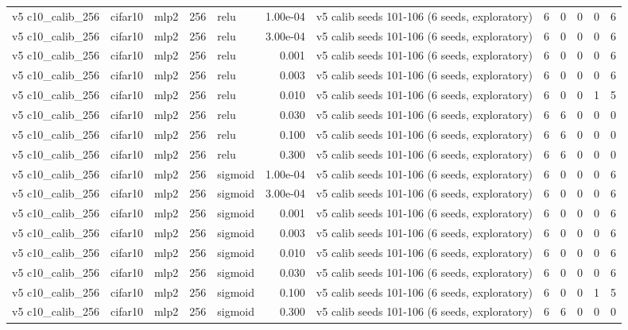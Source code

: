 \begin{table}[htbp]
{\begin{tabular}{@{}lllrlrlrrrrr@{}}
v5 c10\_calib\_256 & cifar10 & mlp2 & 256 & relu & 1.00e-04 & v5 calib seeds 101-106 (6 seeds, exploratory) & 6 & 0 & 0 & 0 & 6 \\
v5 c10\_calib\_256 & cifar10 & mlp2 & 256 & relu & 3.00e-04 & v5 calib seeds 101-106 (6 seeds, exploratory) & 6 & 0 & 0 & 0 & 6 \\
v5 c10\_calib\_256 & cifar10 & mlp2 & 256 & relu & 0.001 & v5 calib seeds 101-106 (6 seeds, exploratory) & 6 & 0 & 0 & 0 & 6 \\
v5 c10\_calib\_256 & cifar10 & mlp2 & 256 & relu & 0.003 & v5 calib seeds 101-106 (6 seeds, exploratory) & 6 & 0 & 0 & 0 & 6 \\
v5 c10\_calib\_256 & cifar10 & mlp2 & 256 & relu & 0.010 & v5 calib seeds 101-106 (6 seeds, exploratory) & 6 & 0 & 0 & 1 & 5 \\
v5 c10\_calib\_256 & cifar10 & mlp2 & 256 & relu & 0.030 & v5 calib seeds 101-106 (6 seeds, exploratory) & 6 & 6 & 0 & 0 & 0 \\
v5 c10\_calib\_256 & cifar10 & mlp2 & 256 & relu & 0.100 & v5 calib seeds 101-106 (6 seeds, exploratory) & 6 & 6 & 0 & 0 & 0 \\
v5 c10\_calib\_256 & cifar10 & mlp2 & 256 & relu & 0.300 & v5 calib seeds 101-106 (6 seeds, exploratory) & 6 & 6 & 0 & 0 & 0 \\
v5 c10\_calib\_256 & cifar10 & mlp2 & 256 & sigmoid & 1.00e-04 & v5 calib seeds 101-106 (6 seeds, exploratory) & 6 & 0 & 0 & 0 & 6 \\
v5 c10\_calib\_256 & cifar10 & mlp2 & 256 & sigmoid & 3.00e-04 & v5 calib seeds 101-106 (6 seeds, exploratory) & 6 & 0 & 0 & 0 & 6 \\
v5 c10\_calib\_256 & cifar10 & mlp2 & 256 & sigmoid & 0.001 & v5 calib seeds 101-106 (6 seeds, exploratory) & 6 & 0 & 0 & 0 & 6 \\
v5 c10\_calib\_256 & cifar10 & mlp2 & 256 & sigmoid & 0.003 & v5 calib seeds 101-106 (6 seeds, exploratory) & 6 & 0 & 0 & 0 & 6 \\
v5 c10\_calib\_256 & cifar10 & mlp2 & 256 & sigmoid & 0.010 & v5 calib seeds 101-106 (6 seeds, exploratory) & 6 & 0 & 0 & 0 & 6 \\
v5 c10\_calib\_256 & cifar10 & mlp2 & 256 & sigmoid & 0.030 & v5 calib seeds 101-106 (6 seeds, exploratory) & 6 & 0 & 0 & 0 & 6 \\
v5 c10\_calib\_256 & cifar10 & mlp2 & 256 & sigmoid & 0.100 & v5 calib seeds 101-106 (6 seeds, exploratory) & 6 & 0 & 0 & 1 & 5 \\
v5 c10\_calib\_256 & cifar10 & mlp2 & 256 & sigmoid & 0.300 & v5 calib seeds 101-106 (6 seeds, exploratory) & 6 & 6 & 0 & 0 & 0 \\

\end{tabular}}
\end{table}
